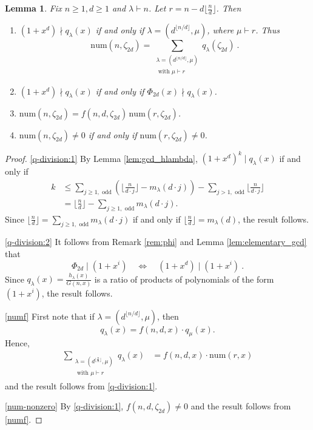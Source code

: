 \documentclass[reqno]{amsart}
\def\num{\mathrm{num}}
\newtheorem{lemma}[theorem]{Lemma}
\theoremstyle{definition}
\begin{document}
\begin{lemma}\label{lem:qlambda2}  Fix $n\geq 1, d\geq 1$ and  $\lambda \vdash n$. Let $r=n-d\lfloor \frac{n}{d}\rfloor$. Then
\begin{enumerate}[label=(\alph*)]
    \item\label{q-division:1} $(1+x^d)\nmid q_\lambda(x)$ if and only if $\lambda=(d^{\lfloor n/d\rfloor},\mu)$, where $\mu\vdash r$. Thus \[\num(n,\zeta_{2d})=\sum_{\substack{\lambda=(d^{\lfloor n/d\rfloor},\mu)\\ \textrm{ with } \mu\vdash r}}q_\lambda(\zeta_{2d})\:.\]
    \item\label{q-division:2} $(1+x^d)\nmid q_\lambda(x)$ if and only if $\Phi_{2d}(x)\nmid q_\lambda(x)$.
 \item\label{numf} $\num(n,\zeta_{2d})=f(n,d,\zeta_{2d})\,\num(r,\zeta_{2d})$.
 \item\label{num-nonzero} $\num(n,\zeta_{2d})\neq 0$ if and only if $\num(r,\zeta_{2d})\neq 0$. 
\end{enumerate}
\end{lemma}
\begin{proof}
   \ref{q-division:1} 
    By Lemma \ref{lem:gcd_hlambda}, $(1+x^d)^k\mid q_\lambda(x)$ if and only if
    \begin{align*}
        k&\leq \sum_{j\geq 1, \textrm{ odd}}(\lfloor\frac{n}{d\cdot j}\rfloor-m_\lambda(d\cdot j))-\sum_{j>1, \textrm{ odd}}\lfloor\frac{n}{d\cdot j}\rfloor\\
        &= \lfloor\frac{n}{d}\rfloor-\sum_{j\geq 1, \textrm{ odd}}m_\lambda(d\cdot j).
        \end{align*}
    Since $\lfloor\frac{n}{d}\rfloor=\sum_{j\geq 1, \textrm{ odd}}m_\lambda(d\cdot j)$ if and only if $\lfloor\frac{n}{d}\rfloor=m_\lambda(d)$,
    the result follows. 
    
    \ref{q-division:2} It follows from Remark \ref{rem:phi} and Lemma \ref{lem:elementary_gcd} that \[\Phi_{2d}\mid (1+x^i)\quad\Longleftrightarrow \quad(1+x^d)\mid (1+x^i)\:.\]
    Since $q_\lambda(x)=\frac{h_\lambda(x)}{G(n,x)}$ is a ratio of products of polynomials of the form $(1+x^i)$, the result follows.
    
  \ref{numf}  First note that if $\lambda=(d^{\lfloor n/d\rfloor},\mu)$, then \begin{equation*} q_\lambda(x)=f(n,d,x)\cdot q_\mu(x).\end{equation*}
Hence,
    \begin{align*}
      \sum_{\substack{\lambda=(d^{\lfloor \frac{n}{d}\rfloor},\mu)\\ \textrm{ with } \mu\vdash r}}q_\lambda(x)&=f(n,d,x)\cdot\num(r,x)
    \end{align*} and the result follows from \ref{q-division:1}.
    
 \ref{num-nonzero}  
By \ref{q-division:1},  $f(n,d,\zeta_{2d})\neq 0$ and the result follows from \ref{numf}.
\end{proof}
\end{document}
